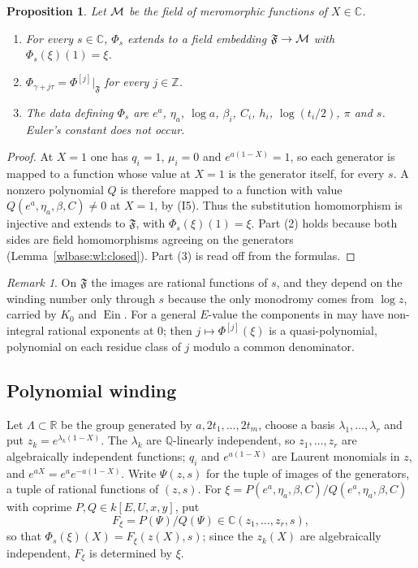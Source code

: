 \documentclass[11pt,a4paper]{article}
\newtheorem{proposition}[theorem]{Proposition}
\theoremstyle{definition}\newtheorem{definition}[theorem]{Definition}
\theoremstyle{remark}\newtheorem{remark}[theorem]{Remark}
\newcommand{\Ein}{\operatorname{Ein}}
\newcommand{\F}{\mathfrak F}\newcommand{\FF}{\mathbb F}
\newcommand{\C}{\mathbb C}\newcommand{\Z}{\mathbb Z}
\newcommand{\Q}{\mathbb Q}\newcommand{\R}{\mathbb R}
\begin{document}
\begin{proposition}\label{wlbase:wl:family}
Let $\mathcal M$ be the field of meromorphic functions of $X\in\C$.
\begin{enumerate}
\item For every $s\in\C$, $\Phi_s$ extends to a field embedding
$\F\to\cM$ with $\Phi_s(\xi)(1)=\xi$.
\item $\Phi_{\gamma+j\tau}=\Phi^{[j]}|_{\F}$ for every $j\in\Z$.
\item The data defining $\Phi_s$ are $e^a$, $\eta_a$, $\log a$, $\beta_i$,
$C_i$, $h_i$, $\log(t_i/2)$, $\pi$ and $s$. Euler's constant does not occur.
\end{enumerate}
\end{proposition}

\begin{proof}
At $X=1$ one has $q_i=1$, $\mu_i=0$ and $e^{a(1-X)}=1$, so each generator is
mapped to a function whose value at $X=1$ is the generator itself, for every
$s$. A nonzero polynomial $Q$ is therefore mapped to a function with value
$Q(e^a,\eta_a,\beta,C)\ne0$ at $X=1$, by (I5). Thus the substitution
homomorphism is injective and extends to $\F$, with $\Phi_s(\xi)(1)=\xi$.
Part (2) holds because both sides are field homomorphisms agreeing on the
generators (Lemma~\ref{wlbase:wl:closed}). Part (3) is read off from the formulas.
\end{proof}

\begin{remark}\label{wlbase:wl:general}
On $\F$ the images are rational functions of $s$, and they depend on the
winding number only through $s$ because the only monodromy comes from
$\log z$, carried by $K_0$ and $\Ein$. For a general $E$-value the
components in \cite{FR} may have non-integral rational exponents at $0$;
then $j\mapsto\Phi^{[j]}(\xi)$ is a quasi-polynomial, polynomial on each
residue class of $j$ modulo a common denominator.
\end{remark}

\subsection{Polynomial winding}
Let $\Lambda\subset\mathbb R$ be the group generated by $a,2t_1,\dots,2t_m$,
choose a basis $\lambda_1,\dots,\lambda_r$ and put
$z_k=e^{\lambda_k(1-X)}$. The $\lambda_k$ are $\Q$-linearly independent, so
$z_1,\dots,z_r$ are algebraically independent functions; $q_i$ and
$e^{a(1-X)}$ are Laurent monomials in $z$, and
$e^{aX}=e^ae^{-a(1-X)}$. Write $\Psi(z,s)$ for the tuple of images of the
generators, a tuple of rational functions of $(z,s)$. For
$\xi=P(e^a,\eta_a,\beta,C)/Q(e^a,\eta_a,\beta,C)$ with coprime
$P,Q\in k[E,U,x,y]$, put
\[
 F_\xi=P(\Psi)/Q(\Psi)\in\C(z_1,\dots,z_r,s),
\]
so that $\Phi_s(\xi)(X)=F_\xi(z(X),s)$; since the $z_k(X)$ are algebraically
independent, $F_\xi$ is determined by $\xi$.
\end{document}
